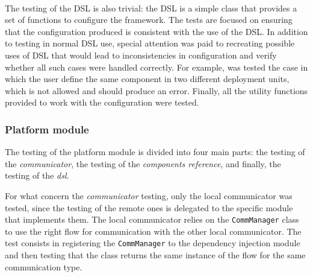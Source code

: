 \paragraph*{}

The testing of the DSL is also trivial: the DSL is a simple class that provides a set of functions to configure the framework. The tests are focused
on ensuring that the configuration produced is consistent with the use of the DSL.
In addition to testing in normal DSL use, special attention was paid to recreating possible uses of DSL that would lead to inconsistencies in
configuration and verify whether all such cases were handled correctly.
For example, was tested the case in which the user define the same component in two different deployment units, which is not allowed and should
produce an error. Finally, all the utility functions provided to work with the configuration were tested.

\subsubsection{Platform module}

The testing of the platform module is divided into four main parts: the testing of the \emph{communicator}, the testing of the
\emph{components reference}, and finally, the testing of the \emph{dsl}.

For what concern the \emph{communicator} testing, only the local communicator was tested, since the testing of the remote ones is delegated to the
specific module that implements them. The local communicator relies on the \texttt{CommManager} class to use the right flow for communication
with the other local communicator.
The test consists in registering the \texttt{CommManager} to the dependency injection module and then testing that the class returns
the same instance of the flow for the same communication type.

